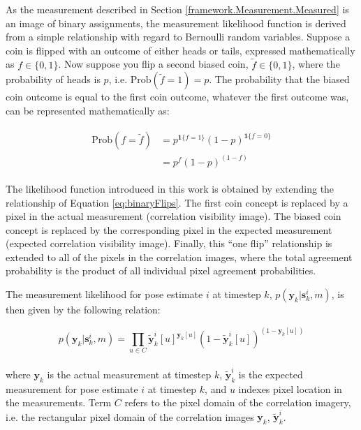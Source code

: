 As the measurement described in Section \ref{framework.Measurement.Measured} is an image of binary assignments, the measurement likelihood function is derived from a simple relationship with regard to Bernoulli random variables.  Suppose a coin is flipped with an outcome of either heads or tails, expressed mathematically as $f \in \{0,1\}$.  Now suppose you flip a second biased coin, $\tilde{f} \in \{0,1\}$, where the probability of heads is $p$, i.e. $\text{Prob}(\tilde{f} = 1) = p$.  The probability that the biased coin outcome is equal to the first coin outcome, whatever the first outcome was, can be represented mathematically as: 

\begin{align}
\begin{split}
\text{Prob}(f=\tilde{f}) &= p^{\mathbf{1}\{f=1\}} (1 - p)^{\mathbf{1}\{f=0\}} \\
&= p^{f}(1-p)^{(1-f)}
\end{split}
\label{eq:binaryFlips}
\end{align}

The likelihood function introduced in this work is obtained by extending the relationship of Equation \ref{eq:binaryFlips}.
The first coin concept is replaced by a pixel in the actual measurement (correlation visibility image).
The biased coin concept is replaced by the corresponding pixel in the expected measurement (expected correlation visibility image).
Finally, this ``one flip'' relationship is extended to all of the pixels in the correlation images, where the total agreement probability is the product of all individual pixel agreement probabilities.

The measurement likelihood for pose estimate $i$ at timestep $k$, $p(\mathbf{y}_k | \mathbf{s}_k^{i}, m)$, is then given by the following relation:

\begin{equation}
p(\mathbf{y}_k | \mathbf{s}_k^{i}, m)  = \prod_{u \in C} \tilde{\mathbf{y}}_k^{i}[u]^{\mathbf{y}_k[u]} (1 - \tilde{\mathbf{y}}_k^{i}[u])^{(1 - \mathbf{y}_k[u])}
\label{eq:measWeight}
\end{equation}
\\
\noindent where $\mathbf{y}_k$ is the actual measurement at timestep $k$, $\tilde{\mathbf{y}}_k^{i}$ is the expected measurement for pose estimate $i$ at timestep $k$, and $u$ indexes pixel location in the measurements.
Term $C$ refers to the pixel domain of the correlation imagery, i.e. the rectangular pixel domain of the correlation images $\mathbf{y}_k$, $\tilde{\mathbf{y}}_k^{i}$.

